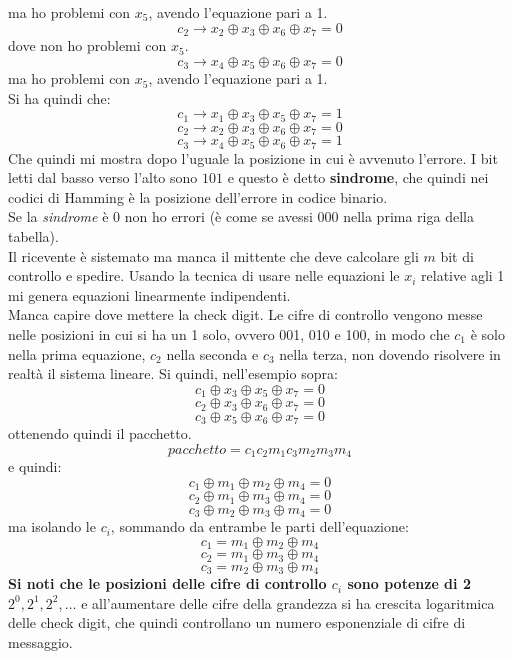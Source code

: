 \documentclass[a4paper,12pt, oneside]{book}
\begin{document}
ma ho problemi con $x_5$, avendo l'equazione pari a 1.\\
\[c_2\to x_2\oplus x_3\oplus x_6 \oplus x_7=0\]
dove non ho problemi con $x_5$.\\
\[c_3\to x_4\oplus x_5\oplus x_6 \oplus x_7=0\]
ma ho problemi con $x_5$, avendo l'equazione pari a 1.\\
Si ha quindi che:
\[c_1\to x_1\oplus x_3\oplus x_5 \oplus x_7=1\]
\[c_2\to x_2\oplus x_3\oplus x_6 \oplus x_7=0\]
\[c_3\to x_4\oplus x_5\oplus x_6 \oplus x_7=1\]
Che quindi mi mostra dopo l'uguale la posizione in cui è avvenuto
l'errore. I bit letti dal basso verso l'alto sono $101$ e questo è detto
\textbf{sindrome}, che quindi nei codici di Hamming è la 
posizione dell'errore in codice binario. \\
Se la \textit{sindrome} è 0 non ho errori (è come se avessi 000 nella prima riga
della tabella).\\
Il ricevente è sistemato ma manca il mittente che deve calcolare gli $m$ bit di
controllo e spedire. Usando la tecnica di usare nelle equazioni le $x_i$
relative agli 1 mi genera equazioni linearmente indipendenti. \\
Manca capire dove
mettere la check digit. Le cifre di controllo vengono messe nelle posizioni in
cui si ha un 1 solo, ovvero 001, 010 e 100, in modo che $c_1$ è solo nella prima
equazione, $c_2$ nella seconda e $c_3$ nella terza, non dovendo risolvere in
realtà il sistema lineare. Si quindi, nell'esempio sopra:
\[c_1\oplus x_3\oplus x_5 \oplus x_7=0\]
\[c_2\oplus x_3\oplus x_6 \oplus x_7=0\]
\[c_3\oplus x_5\oplus x_6 \oplus x_7=0\]
ottenendo quindi il pacchetto.
\[pacchetto = c_1c_2m_1c_3m_2m_3m_4\]
e quindi:
\[c_1\oplus m_1\oplus m_2 \oplus m_4=0\]
\[c_2\oplus m_1\oplus m_3 \oplus m_4=0\]
\[c_3\oplus m_2\oplus m_3 \oplus m_4=0\]
ma isolando le $c_i$, sommando da entrambe le parti dell'equazione:
\[c_1= m_1\oplus m_2 \oplus m_4\]
\[c_2= m_1\oplus m_3 \oplus m_4\]
\[c_3= m_2\oplus m_3 \oplus m_4\]
\textbf{Si noti che le posizioni delle cifre di controllo $c_i$ sono potenze di
  2 $2^0,2^1,2^2,\ldots$} e all'aumentare delle cifre della grandezza si ha
crescita logaritmica delle check digit, che quindi controllano un numero
esponenziale di cifre di messaggio.\\
\end{document}
